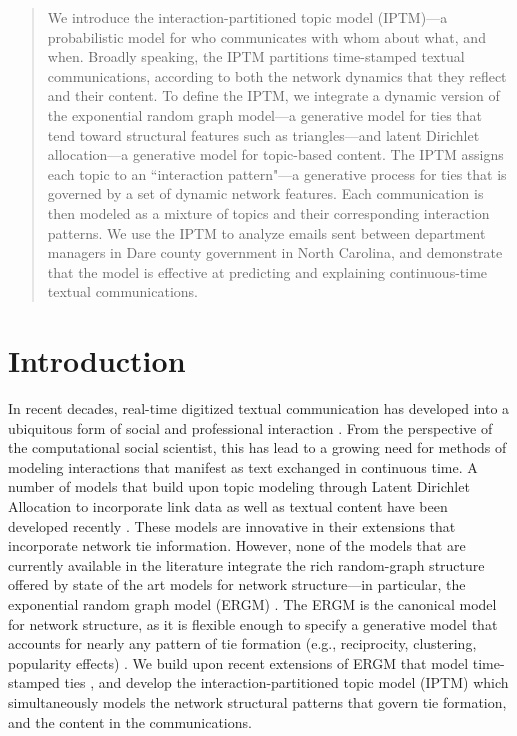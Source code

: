 \documentclass{article}
\begin{document}
\printAffiliationsAndNotice{\icmlEqualContribution} %

\begin{abstract}
We introduce the interaction-partitioned topic model
(IPTM)---a probabilistic model for who communicates with whom about
what, and when. Broadly speaking, the IPTM partitions time-stamped
textual communications, according to both the network
dynamics that they reflect and their content. To define the IPTM, we
integrate a dynamic version of the exponential random graph model---a generative model for ties that tend toward structural features such as triangles---and latent Dirichlet allocation---a generative model for topic-based content.
The IPTM assigns each topic to an ``interaction
pattern"---a generative process for ties that is governed by a set of
dynamic network features. Each communication is then modeled as a
mixture of topics and their corresponding interaction patterns. We use
the IPTM to analyze emails sent between department managers in Dare
county government in North Carolina, and demonstrate that the model is effective
at predicting and explaining continuous-time textual communications.
\end{abstract}

\section{Introduction}
\label{Introduction}
In recent decades, real-time digitized textual communication has developed into a ubiquitous form of social and professional interaction \cite{kanungo2008modeling, szostek2011dealing, burgess2004email, pew2016}. From the perspective of the computational social scientist, this has lead to a growing need for methods of modeling interactions that manifest as text exchanged in continuous time. A number of models that build upon topic modeling through Latent Dirichlet Allocation \cite{Blei2003} to incorporate link data as well as textual content have been developed recently \cite{mccallum2005author,lim2013twitter,Krafft2012}. These models are innovative in their extensions that incorporate network tie information. However, none of the models that are currently available in the literature integrate the rich random-graph structure offered by state of the art models for network structure---in particular, the exponential random graph model (ERGM) \cite{robins2007introduction,chatterjee2013estimating,hunter2008ergm}. The ERGM is the canonical model for network structure, as it is flexible enough to specify a generative model that accounts for nearly any pattern of tie formation (e.g., reciprocity, clustering, popularity effects) \cite{desmarais2017statistical}. We build upon recent extensions of ERGM that model time-stamped ties \cite{PerryWolfe2012,Butts2008}, and develop the interaction-partitioned topic model (IPTM) which simultaneously models the network structural patterns that govern tie formation, and the content in the communications.
\end{document}
